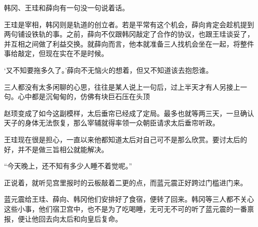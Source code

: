 韩冈、王珪和薛向有一句没一句说着话。

王珪是宰相，韩冈则是轨道的创立者。若是平常有这个机会，薛向肯定会趁机提到两句铺设铁轨的事。之前，薛向不仅跟韩冈敲定了合作的协议，也跟王珪谈妥了，并互相之间做了利益交换。就薛向而言，他本就准备三人找机会坐在一起，将整件事给敲定，但现在实在不是时候。

‘又不知要拖多久了。’薛向不无恼火的想着，但又不知道该去抱怨谁。

三人都没有太多闲聊的心思，往往是某人说上一句后，过上半天才有人另接上一句。心中都是沉甸甸的，仿佛有块巨石压在头顶

赵顼变成了如今这副模样，太后垂帘已经成了定局。最多也就等两三天，一旦确认天子的身体无法恢复，那么宰辅就得率领一众朝臣请求太后垂帘听政。

王珪现在很是担心，一直以来他都知道太后对自己可不是那么欣赏。要讨太后的好，并不是做三旨相公就能解决。

“今天晚上，还不知有多少人睡不着觉呢。”

正说着，就听见宫里报时的云板敲着二更的点，而蓝元震正好跨过门槛进门来。

蓝元震给王珪、薛向、韩冈他们安排好了食宿，便转了回来。韩冈等三人都不关心这些小事，他们宿卫宫中，也不是为了吃喝睡，无可无不可的听了蓝元震的一番禀报，便让他回去向太后和向皇后复命。

